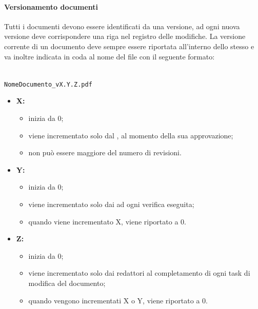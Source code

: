 	  \paragraph{Versionamento documenti}
		  Tutti i documenti devono essere identificati da una versione, ad ogni nuova versione deve corrispondere una riga nel registro delle modifiche.
		  La versione corrente di un documento deve sempre essere riportata all'interno dello stesso e va inoltre indicata in coda al nome del file con il seguente formato:\\\\
		  \centerline{\texttt{NomeDocumento\_vX.Y.Z.pdf}}
		  \begin{itemize}
		  	\item \textbf{X:}
		  	\begin{itemize}
		  		\item inizia da 0;
		  		\item viene incrementato solo dal \responsabilediprogetto, al momento della sua approvazione; 
		  		\item non può essere maggiore del numero di revisioni.
		  	\end{itemize}
		  	\item \textbf{Y:}
		  	\begin{itemize}
		  		\item inizia da 0;
		  		\item viene incrementato solo dai \verificatori{} ad ogni verifica eseguita;
		  		\item quando viene incrementato X, viene riportato a 0.
		  	\end{itemize}
		  	\item \textbf{Z:}
		  	\begin{itemize}
		  		\item inizia da 0;
		  		\item viene incrementato solo dai redattori al completamento di ogni task di modifica del documento;
		  		\item quando vengono incrementati X o Y, viene riportato a 0.
		  	\end{itemize}
		  \end{itemize}

